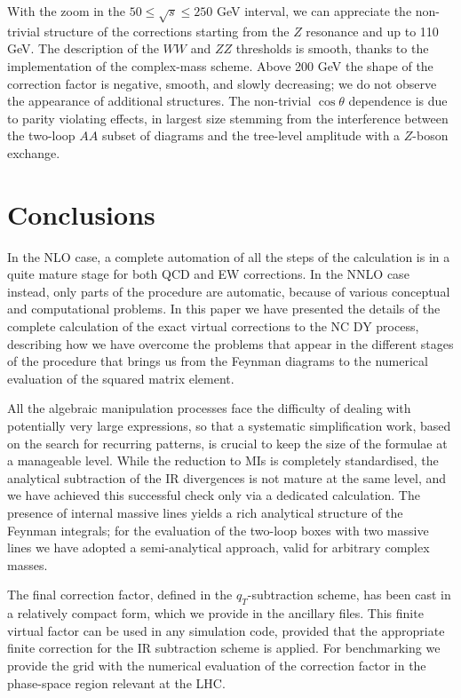 \documentclass[11pt,a4paper]{article}
\begin{document}
With the zoom in the $50\leq\sqrt{s}\leq 250$ GeV interval,
we can appreciate the non-trivial structure of the corrections
starting from the $Z$ resonance and up to 110 GeV.
The description of the $WW$ and $ZZ$ thresholds is smooth,
thanks to the implementation of the complex-mass scheme.
Above 200 GeV the shape of the correction factor is negative, smooth,
and slowly decreasing;
we do not observe the appearance of additional structures.
The non-trivial $\cos\theta$ dependence is due to parity violating effects,
in largest size stemming from the interference between the two-loop
$AA$ subset of diagrams and the tree-level amplitude with a $Z$-boson exchange.






\section{Conclusions}
\label{sec:conclusions}
In the NLO case, a complete automation of all the steps of
the calculation is in a quite mature stage for both QCD and EW corrections.
In the  NNLO case instead, only parts of the procedure are automatic,
because of various conceptual and computational problems.
In this paper we have presented the details of the complete calculation
of the exact \oaas virtual corrections to the NC DY process,
describing how we have overcome the problems
that appear in the different stages of the procedure
that brings us from the Feynman diagrams
to the numerical evaluation of the squared matrix element.

All the algebraic manipulation processes face the difficulty of dealing with
potentially very large expressions, so that a systematic simplification
work, based on the search for recurring patterns,
is crucial to keep the size of the formulae at a manageable level.
While the reduction to MIs is completely standardised,
the analytical subtraction of the IR divergences
is not mature at the same level,
and we have achieved this successful check only via a dedicated calculation.
The presence of internal massive lines yields a rich analytical structure
of the Feynman integrals;
for the evaluation of the two-loop boxes with two massive lines
we have adopted a semi-analytical approach, valid for arbitrary complex masses.

The final correction factor, defined in the $q_T$-subtraction scheme,
has been cast in a relatively compact form,
which we provide in the ancillary files.
This finite virtual factor can be used in any simulation code,
provided that the appropriate finite correction for the IR subtraction scheme
is applied.
For benchmarking we provide the grid with the numerical evaluation
of the correction factor in the phase-space region relevant at the LHC.
\end{document}
